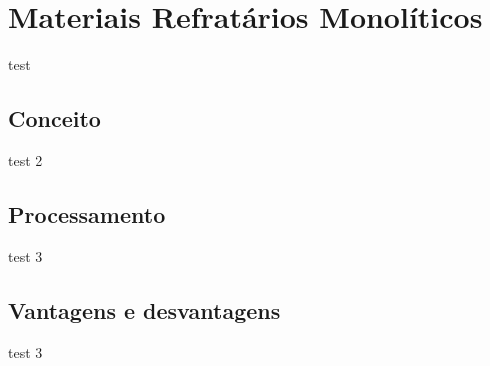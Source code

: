 \section{Materiais Refratários Monolíticos}\label{mono}

test

    \subsection{Conceito}
    test 2

    \subsection{Processamento}
    test 3


    \subsection{Vantagens e desvantagens}
    test 3